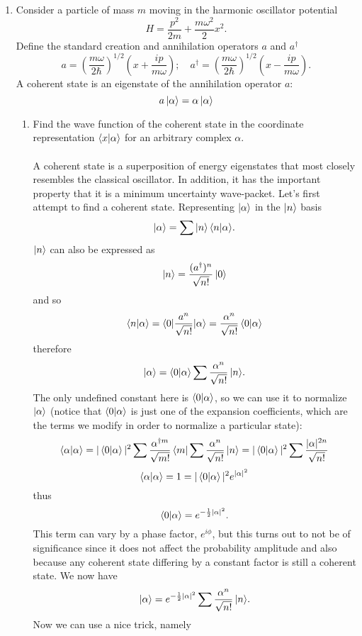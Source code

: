 \documentclass[11pt,letterpaper]{article}
\begin{document}
\begin{enumerate}
\begin{enumerate}
  \end{enumerate}
  \item Consider a particle of mass $m$ moving in the harmonic oscillator potential
  $$H = \frac{p^2}{2m}+\frac{m\omega^2}{2}x^2.$$
  Define the standard creation and annihilation operators $a$ and $a^\dag$
  $$a =\left(\frac{m\omega}{2\hbar}\right)^{1/2}\left(x+\frac{ip}{m\omega}\right);\quad a^\dag = \left(\frac{m\omega}{2\hbar}\right)^{1/2}\left(x-\frac{ip}{m\omega}\right).$$
  A coherent state is an eigenstate of the annihilation operator $a$:
  $$a\ket\alpha = \alpha\ket\alpha$$
      \begin{enumerate}
  \item Find the wave function of the coherent state in the coordinate representation $\braket{x|\alpha}$ for an arbitrary complex $\alpha$.
  \\ \\A coherent state is a superposition of energy eigenstates that most closely resembles the classical oscillator. In addition, it has the important property that it is a minimum uncertainty wave-packet. Let's first attempt to find a coherent state. Representing $\ket\alpha$ in the $\ket n$ basis
  $$\ket\alpha = \sum{\ket n\braket{n|\alpha}}.$$
  $\ket n$ can also be expressed as
  $$\ket n = \frac{(a^\dag)^n}{\sqrt{n!}}\ket 0$$
  and so
  $$\braket{n|\alpha} = \braket{0|\frac{a^n}{\sqrt{n!}}|\alpha}=\frac{\alpha^n}{\sqrt{n!}}\braket{0|\alpha}$$
  therefore
  $$\ket\alpha = \braket{0|\alpha}\sum{\frac{\alpha^n}{\sqrt{n!}}\ket n}.$$
The only undefined constant here is $\braket{0|\alpha}$, so we can use it to normalize $\ket\alpha$ (notice that $\braket{0|\alpha}$ is just one of the expansion coefficients, which are the terms we modify in order to normalize a particular state):
  $$\braket{\alpha|\alpha} = |\braket{0|\alpha}|^2\sum{\frac{\alpha^{\dag m}}{\sqrt{m!}}\bra m}\sum{\frac{\alpha^n}{\sqrt{n!}}\ket n} = |\braket{0|\alpha}|^2\sum{\frac{|\alpha|^{2n}}{\sqrt{n!}}}$$
  $$\braket{\alpha|\alpha} = 1 = |\braket{0|\alpha}|^2e^{|\alpha|^2}$$
  thus
  $$\braket{0|\alpha}=e^{-\frac{1}{2}|\alpha|^2}.$$
This term can vary by a phase factor, $e^{i\phi}$, but this turns out to not be of significance since it does not affect the probability amplitude and also because any coherent state differing by a constant factor is still a coherent state. We now have
  \begin{equation}\label{7}\ket\alpha = e^{-\frac{1}{2}|\alpha|^2}\sum{\frac{\alpha^n}{\sqrt{n!}}\ket n}.\end{equation}
  Now we can use a nice trick, namely

\end{enumerate}
\end{enumerate}
\end{document}
